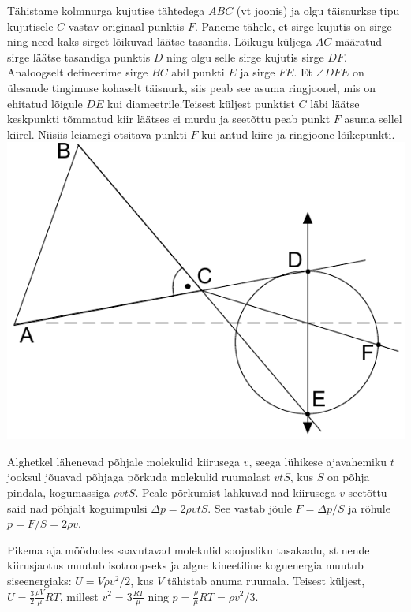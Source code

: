 \documentclass[10pt]{article}
\begin{document}
\solu
Tähistame kolmnurga kujutise tähtedega $ABC$ (vt joonis) ja olgu täisnurkse tipu kujutisele $C$ vastav originaal punktis $F$. Paneme tähele, et sirge kujutis on sirge ning need kaks sirget lõikuvad läätse tasandis. Lõikugu küljega $AC$ määratud sirge läätse tasandiga punktis $D$ ning olgu selle sirge kujutis sirge $DF$. Analoogselt defineerime sirge 
$BC$ abil punkti $E$ ja sirge $FE$. Et $\angle DFE$ on ülesande tingimuse kohaselt täisnurk, siis peab see asuma ringjoonel, mis on ehitatud lõigule $DE$ kui diameetrile.Teisest küljest punktist $C$ läbi läätse keskpunkti tõmmatud kiir läätses ei murdu ja seetõttu peab punkt $F$ asuma sellel kiirel. Niisiis leiamegi otsitava punkti $F$ kui antud kiire ja ringjoone lõikepunkti. \includegraphics{2018-lahg-08-yl.pdf}
\probend
\bigskip


\solu
Alghetkel lähenevad põhjale molekulid kiirusega $v$, seega lühikese ajavahemiku $t$ jooksul jõuavad põhjaga põrkuda molekulid ruumalast $vtS$, kus $S$ on põhja pindala, kogumassiga $\rho vtS$. Peale põrkumist lahkuvad nad kiirusega $v$ seetõttu said nad põhjalt koguimpulsi $\Delta p=2\rho vtS$. See vastab jõule $F=\Delta p/S$ ja rõhule $p=F/S=2\rho v$.

Pikema aja möödudes saavutavad molekulid soojusliku tasakaalu, st nende kiirusjaotus muutub isotroopseks ja algne kineetiline koguenergia muutub siseenergiaks: $U=V\rho v^2/2$, kus $V$ tähistab anuma ruumala. Teisest küljest, $U=\frac 32 \frac{\rho V}\mu RT$, millest $v^2=3 \frac{ RT}\mu$ ning $p=\frac{\rho}\mu RT=\rho v^2/3$.
\probend
\bigskip
\end{document}
